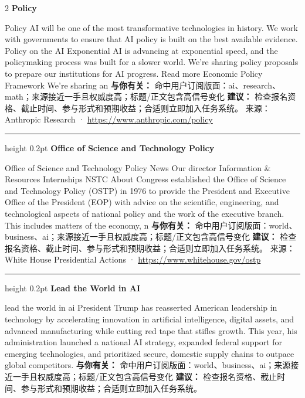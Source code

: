 \documentclass[10.5pt]{ctexart}
\begin{document}
\begin{multicols}{2}
{\large\bfseries Policy}\par
Policy AI will be one of the most transformative technologies in history. We work with governments to ensure that AI policy is built on the best available evidence. Policy on the AI Exponential AI is advancing at exponential speed, and the policymaking process was built for a slower world. We’re sharing policy proposals to prepare our institutions for AI progress. Read more Economic Policy Framework We’re sharing an 
\textbf{与你有关：} 命中用户订阅版面：ai、research、math；来源接近一手且权威度高；标题/正文包含高信号变化
\textbf{建议：} 检查报名资格、截止时间、参与形式和预期收益；合适则立即加入任务系统。
{\footnotesize\color{ormuted} 来源：Anthropic Research · \url{https://www.anthropic.com/policy}}
\vspace{2mm}
\hrule height 0.2pt
\vspace{2mm}
{\large\bfseries Office of Science and Technology Policy}\par
Office of Science and Technology Policy News Our director Information \& Resources Internships NSTC About Congress established the Office of Science and Technology Policy (OSTP) in 1976 to provide the President and Executive Office of the President (EOP) with advice on the scientific, engineering, and technological aspects of national policy and the work of the executive branch. This includes matters of the economy, n
\textbf{与你有关：} 命中用户订阅版面：world、business、ai；来源接近一手且权威度高；标题/正文包含高信号变化
\textbf{建议：} 检查报名资格、截止时间、参与形式和预期收益；合适则立即加入任务系统。
{\footnotesize\color{ormuted} 来源：White House Presidential Actions · \url{https://www.whitehouse.gov/ostp}}
\vspace{2mm}
\hrule height 0.2pt
\vspace{2mm}
{\large\bfseries Lead the World in AI}\par
lead the world in ai President Trump has reasserted American leadership in technology by accelerating innovation in artificial intelligence, digital assets, and advanced manufacturing while cutting red tape that stifles growth. This year, his administration launched a national AI strategy, expanded federal support for emerging technologies, and prioritized secure, domestic supply chains to outpace global competitors.
\textbf{与你有关：} 命中用户订阅版面：world、business、ai；来源接近一手且权威度高；标题/正文包含高信号变化
\textbf{建议：} 检查报名资格、截止时间、参与形式和预期收益；合适则立即加入任务系统。

\end{multicols}
\end{document}
